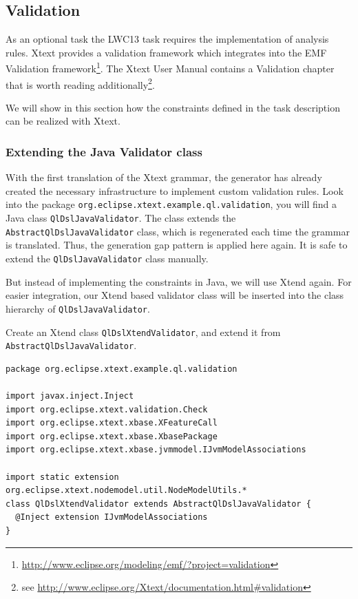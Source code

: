 \subsection{Validation} \label{sec:validation}

As an optional task the LWC13 task requires the implementation of
analysis rules. Xtext provides a validation framework which integrates into the
EMF Validation
framework\footnote{\url{http://www.eclipse.org/modeling/emf/?project=validation}}.
The Xtext User Manual contains a Validation chapter that is
worth reading additionally\footnote{see
\url{http://www.eclipse.org/Xtext/documentation.html\#validation}}.

We will show in this section how the constraints defined in the task description
can be realized with Xtext.

\subsubsection{Extending the Java Validator class}
With the first translation of the Xtext grammar, the generator has already
created the necessary infrastructure to implement custom validation rules.
Look into the package \newline\texttt{org.eclipse.xtext.example.ql.validation},
you will find a Java class \texttt{QlDslJavaValidator}. The class extends the
\texttt{AbstractQlDslJavaValidator} class, which is regenerated each time the
grammar is translated. Thus, the generation gap pattern is applied here again.
It is safe to extend the \texttt{QlDslJavaValidator} class manually.

But instead of implementing the constraints in Java, we will use Xtend again.
For easier integration, our Xtend based validator class will be inserted into
the class hierarchy of \newline\texttt{QlDslJavaValidator}.

Create an Xtend class \texttt{QlDslXtendValidator}, and extend it from
\texttt{AbstractQlDslJavaValidator}.

\begin{lstlisting}[language=Xtend]
package org.eclipse.xtext.example.ql.validation

import javax.inject.Inject
import org.eclipse.xtext.validation.Check
import org.eclipse.xtext.xbase.XFeatureCall
import org.eclipse.xtext.xbase.XbasePackage
import org.eclipse.xtext.xbase.jvmmodel.IJvmModelAssociations

import static extension org.eclipse.xtext.nodemodel.util.NodeModelUtils.*
class QlDslXtendValidator extends AbstractQlDslJavaValidator {
  @Inject extension IJvmModelAssociations
}
\end{lstlisting}

